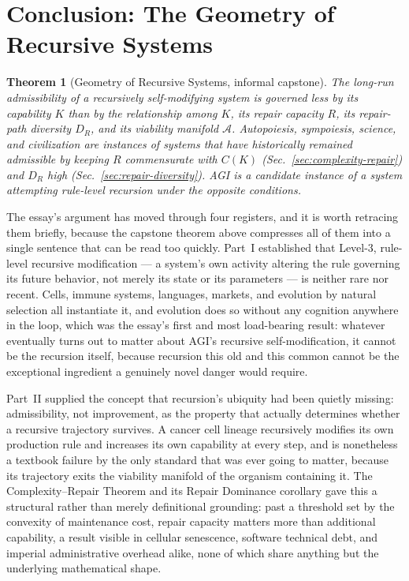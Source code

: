 \documentclass[11pt,a4paper]{article}
\theoremstyle{plain}
\newtheorem{theorem}{Theorem}[section]
\theoremstyle{definition}
\theoremstyle{remark}
\newcommand{\Adm}{\mathcal{A}}
\newcommand{\DR}{D_R}
\begin{document}
\section{Conclusion: The Geometry of Recursive Systems}
\label{sec:conclusion}

\begin{theorem}[Geometry of Recursive Systems, informal capstone]
\label{thm:geometry-capstone}
The long-run admissibility of a recursively self-modifying system is governed less by its capability $K$ than by the relationship among $K$, its repair capacity $R$, its repair-path diversity $\DR$, and its viability manifold $\Adm$. Autopoiesis, sympoiesis, science, and civilization are instances of systems that have historically remained admissible by keeping $R$ commensurate with $C(K)$ (Sec.~\ref{sec:complexity-repair}) and $\DR$ high (Sec.~\ref{sec:repair-diversity}). AGI is a candidate instance of a system attempting rule-level recursion under the opposite conditions.
\end{theorem}

The essay's argument has moved through four registers, and it is worth retracing them briefly, because the capstone theorem above compresses all of them into a single sentence that can be read too quickly. Part~I established that Level-3, rule-level recursive modification — a system's own activity altering the rule governing its future behavior, not merely its state or its parameters — is neither rare nor recent. Cells, immune systems, languages, markets, and evolution by natural selection all instantiate it, and evolution does so without any cognition anywhere in the loop, which was the essay's first and most load-bearing result: whatever eventually turns out to matter about AGI's recursive self-modification, it cannot be the recursion itself, because recursion this old and this common cannot be the exceptional ingredient a genuinely novel danger would require.

Part~II supplied the concept that recursion's ubiquity had been quietly missing: admissibility, not improvement, as the property that actually determines whether a recursive trajectory survives. A cancer cell lineage recursively modifies its own production rule and increases its own capability at every step, and is nonetheless a textbook failure by the only standard that was ever going to matter, because its trajectory exits the viability manifold of the organism containing it. The Complexity--Repair Theorem and its Repair Dominance corollary gave this a structural rather than merely definitional grounding: past a threshold set by the convexity of maintenance cost, repair capacity matters more than additional capability, a result visible in cellular senescence, software technical debt, and imperial administrative overhead alike, none of which share anything but the underlying mathematical shape.
\end{document}
